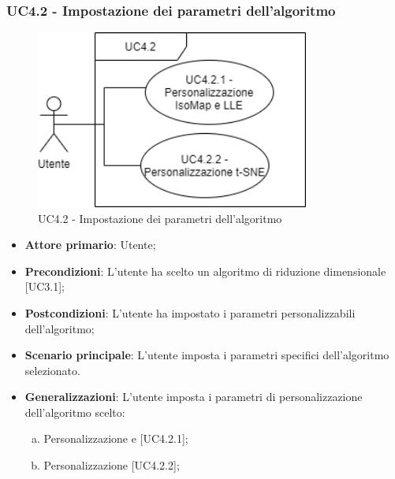 \subsubsection{UC4.2 - Impostazione dei parametri dell'algoritmo}
\begin{figure}[h]
\includegraphics[width=9cm]{Section/Images/UC4.2.png}
\centering
\caption{UC4.2 - Impostazione dei parametri dell'algoritmo}
\end{figure}
\begin{itemize}
	\item \textbf{Attore primario}: Utente;
	
	\item \textbf{Precondizioni}: L'utente ha scelto un algoritmo di riduzione dimensionale [UC3.1];
	
	\item \textbf{Postcondizioni}: L'utente ha impostato i parametri personalizzabili dell'algoritmo;
	
	\item \textbf{Scenario principale}: L'utente imposta i parametri specifici dell'algoritmo selezionato.
	
		\item \textbf{Generalizzazioni}: L'utente imposta i parametri di personalizzazione dell'algoritmo scelto:
	\begin{enumerate}[(a)]
		\item Personalizzazione  e  [UC4.2.1];
		\item Personalizzazione  [UC4.2.2];
	\end{enumerate}
\end{itemize}		
		


